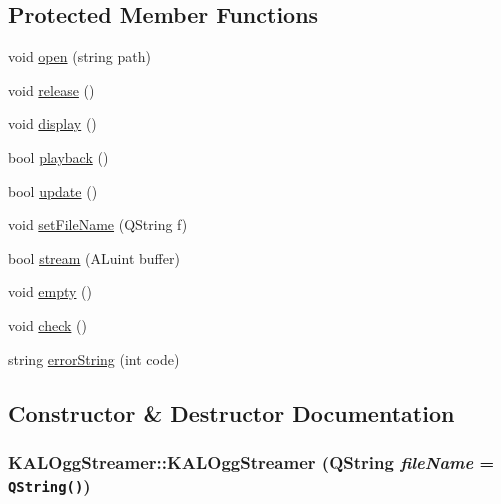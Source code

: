 \subsection*{Protected Member Functions}
\begin{CompactItemize}
\item 
void \hyperlink{class_k_a_l_ogg_streamer_4882e0e6683cc1f1fac2d32eef14c632}{open} (string path)
\item 
void \hyperlink{class_k_a_l_ogg_streamer_7b92c3adf5c19912f3c08e3b2444b71a}{release} ()
\item 
void \hyperlink{class_k_a_l_ogg_streamer_911c613e462ad7fa2c8d31e0f440427c}{display} ()
\item 
bool \hyperlink{class_k_a_l_ogg_streamer_a2afddafb7091782f7bfe36480da6450}{playback} ()
\item 
bool \hyperlink{class_k_a_l_ogg_streamer_fdff13c3b0410772c25c437a529b7023}{update} ()
\item 
void \hyperlink{class_k_a_l_ogg_streamer_6e3d93df059cc105900460652df46ddd}{setFileName} (QString f)
\item 
bool \hyperlink{class_k_a_l_ogg_streamer_06ad135cc8e1f9d2220f47ff06603b23}{stream} (ALuint buffer)
\item 
void \hyperlink{class_k_a_l_ogg_streamer_835a0ca89543e3c977cf7c3a8228fca4}{empty} ()
\item 
void \hyperlink{class_k_a_l_ogg_streamer_599388d62822c02aff24c7367db983de}{check} ()
\item 
string \hyperlink{class_k_a_l_ogg_streamer_fee6d18eb74b3d4bf1654d58bc8e28c4}{errorString} (int code)
\end{CompactItemize}


\subsection{Constructor \& Destructor Documentation}
\hypertarget{class_k_a_l_ogg_streamer_7ed841dd05fc957a59d3b07706bf7ee9}{
\subsubsection[{KALOggStreamer}]{\setlength{\rightskip}{0pt plus 5cm}KALOggStreamer::KALOggStreamer (QString {\em fileName} = {\tt QString()})}}
\label{class_k_a_l_ogg_streamer_7ed841dd05fc957a59d3b07706bf7ee9}




